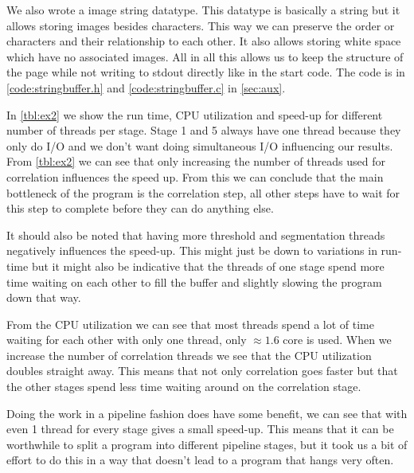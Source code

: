 \documentclass[a4paper]{article}
\begin{document}


We also wrote a image string datatype. This datatype is basically a string but it allows storing images besides characters. This way we can preserve the order or characters and their relationship to each other. It also allows storing white space which have no associated images. All in all this allows us to keep the structure of the page while not writing to stdout directly like in the start code. The code is in \autoref{code:stringbuffer.h} and \autoref{code:stringbuffer.c} in \autoref{sec:aux}.

In \autoref{tbl:ex2} we show the run time, CPU utilization and speed-up for different number of threads per stage. Stage 1 and 5 always have one thread because they only do I/O and we don't want doing simultaneous I/O influencing our results. From \autoref{tbl:ex2} we can see that only increasing the number of threads used for correlation influences the speed up. From this we can conclude that the main bottleneck of the program is the correlation step, all other steps have to wait for this step to complete before they can do anything else.

It should also be noted that having more threshold and segmentation threads negatively influences the speed-up. This might just be down to variations in run-time but it might also be indicative that the threads of one stage spend more time waiting on each other to fill the buffer and slightly slowing the program down that way.

From the CPU utilization we can see that most threads spend a lot of time waiting for each other with only one thread, only $\approx 1.6$ core is used. When we increase the number of correlation threads we see that the CPU utilization doubles straight away. This means that not only correlation goes faster but that the other stages spend less time waiting around on the correlation stage.

Doing the work in a pipeline fashion does have some benefit, we can see that with even 1 thread for every stage gives a small speed-up. This means that it can be worthwhile to split a program into different pipeline stages, but it took us a bit of effort to do this in a way that doesn't lead to a program that hangs very often.
\end{document}
